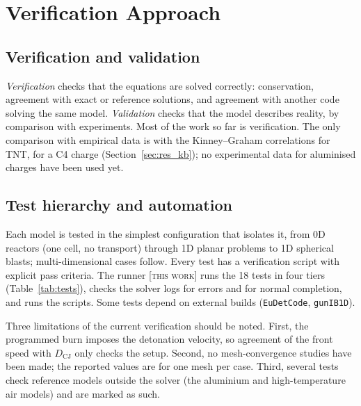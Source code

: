 \documentclass{article}
\newcommand{\tw}{\textsc{[this work]}}
\begin{document}
\section{Verification Approach}
\label{sec:verification}

\subsection{Verification and validation}

\emph{Verification} checks that the equations are solved correctly: conservation, agreement with exact or reference solutions, and agreement with another code solving the same model. \emph{Validation} checks that the model describes reality, by comparison with experiments. Most of the work so far is verification. The only comparison with empirical data is with the Kinney--Graham correlations for TNT, for a C4 charge (Section~\ref{sec:res_kb}); no experimental data for aluminised charges have been used yet.

\subsection{Test hierarchy and automation}

Each model is tested in the simplest configuration that isolates it, from 0D reactors (one cell, no transport) through 1D planar problems to 1D spherical blasts; multi-dimensional cases follow. Every test has a verification script with explicit pass criteria. The runner  \tw{} runs the 18 tests in four tiers (Table~\ref{tab:tests}), checks the solver logs for errors and for normal completion, and runs the scripts. Some tests depend on external builds (\texttt{EuDetCode}, \texttt{gunIB1D}).

Three limitations of the current verification should be noted. First, the programmed burn imposes the detonation velocity, so agreement of the front speed with $D_\text{CJ}$ only checks the setup. Second, no mesh-convergence studies have been made; the reported values are for one mesh per case. Third, several tests check reference models outside the solver (the aluminium and high-temperature air models) and are marked as such.
\end{document}
